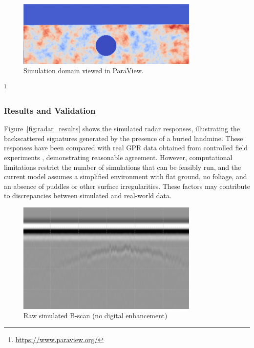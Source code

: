         \begin{figure}[htbp]
            \centering
            \includegraphics[width=0.8\textwidth]{figs/Rory/radar_domain.pdf}
            \caption{Simulation domain viewed in ParaView.}
            \label{fig:radar_domain}
        \end{figure}
        \footnote{\url{https://www.paraview.org/}}
    
    \subsubsection{Results and Validation}
    
        Figure~\ref{fig:radar_results} shows the simulated radar responses, illustrating the backscattered signatures generated by the presence of a buried landmine. These responses have been compared with real GPR data obtained from controlled field experiments \cite{dummyRef7}, demonstrating reasonable agreement. However, computational limitations restrict the number of simulations that can be feasibly run, and the current model assumes a simplified environment with flat ground, no foliage, and an absence of puddles or other surface irregularities. These factors may contribute to discrepancies between simulated and real-world data.
    
        \begin{figure}[htbp]
            \centering
            \includegraphics[width=0.8\textwidth]{figs/Rory/sim_bscan_cropped.png}
            \caption{Raw simulated B-scan (no digital enhancement)}
            \label{fig:original_bscan}
        \end{figure}
    
